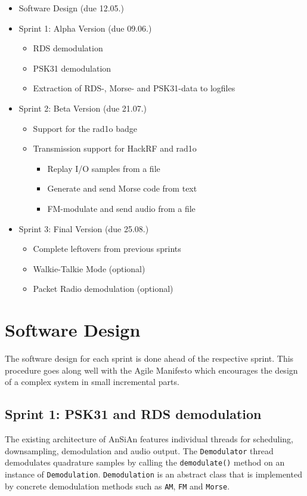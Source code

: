 \begin{itemize}
	\item Software Design (due 12.05.)
	\item Sprint 1: Alpha Version (due 09.06.)
	\begin{itemize}
		\item \ac{RDS} demodulation
		\item \ac{PSK31} demodulation
		\item Extraction of \ac{RDS}-, Morse- and \ac{PSK31}-data to logfiles
	\end{itemize}
	\item Sprint 2: Beta Version (due 21.07.)
	\begin{itemize}
		\item Support for the rad1o badge
		\item Transmission support for HackRF and rad1o
		\begin{itemize}
			\item Replay I/O samples from a file
			\item Generate and send Morse code from text
			\item FM-modulate and send audio from a file
		\end{itemize}
	\end{itemize}
	\item Sprint 3: Final Version (due 25.08.)
	\begin{itemize}
		\item Complete leftovers from previous sprints
		\item Walkie-Talkie Mode (optional)
		\item Packet Radio demodulation (optional)
	\end{itemize}
\end{itemize}

\section{Software Design}

The software design for each sprint is done ahead of the respective sprint.
This procedure goes along well with the Agile Manifesto which
encourages the design of a complex system in small incremental parts.

\subsection{Sprint 1: PSK31 and RDS demodulation}

The existing architecture of \ac{AnSiAn} features individual threads for scheduling, 
downsampling, demodulation and audio output. The \texttt{De\-mo\-du\-la\-tor} thread demodulates 
quadrature samples by calling the \texttt{demodulate()} method on an instance of
\texttt{Demodulation}. \texttt{Demodulation} is an abstract class that is implemented by concrete 
demodulation methods such as \texttt{AM}, \texttt{FM} and \texttt{Morse}. 

